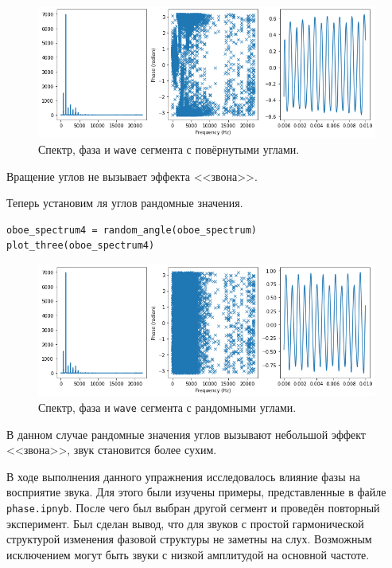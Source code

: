 \documentclass[a4paper, 14pt]{extarticle}
\begin{document}
    \begin{figure}[h]
        \centering
        \includegraphics[width=0.8\linewidth]{resources/Images/task3_three_rotate}
        \caption{Спектр, фаза и \texttt{wave} сегмента с повёрнутыми углами.}
        \label{fig:task3_three_rotate}
    \end{figure}

    Вращение углов не вызывает эффекта <<звона>>.

    Теперь установим ля углов рандомные значения.

    \begin{lstlisting}[caption= Применение \texttt{plot\_three} к сегменту с рандомными углами., label={lst:task3_three_random}]
oboe_spectrum4 = random_angle(oboe_spectrum)
plot_three(oboe_spectrum4)
    \end{lstlisting}

    \begin{figure}[h]
        \centering
        \includegraphics[width=0.8\linewidth]{resources/Images/task3_three_random}
        \caption{Спектр, фаза и \texttt{wave} сегмента с рандомными углами.}
        \label{fig:task3_three_random}
    \end{figure}

    В данном случае рандомные значения углов вызывают небольшой эффект <<звона>>, звук становится более сухим.


    В ходе выполнения данного упражнения исследовалось влияние фазы на восприятие звука. Для этого были изучены примеры,
    представленные в файле \texttt{phase.ipnyb}. После чего был выбран другой сегмент и проведён повторный эксперимент.
    Был сделан вывод, что для звуков с простой гармонической структурой изменения фазовой структуры не заметны на слух.
    Возможным исключением могут быть звуки с низкой амплитудой на основной частоте.
\end{document}
